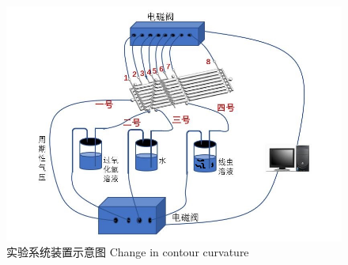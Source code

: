 	\begin{figure}[!t]
	  \centering
	  \includegraphics[width=14cm]{figure/chap5/hardware.jpg}
	  \bicaption
		{实验系统装置示意图}
		{Change in contour curvature}
	  \label{fig:sysdevice}
	\end{figure}

